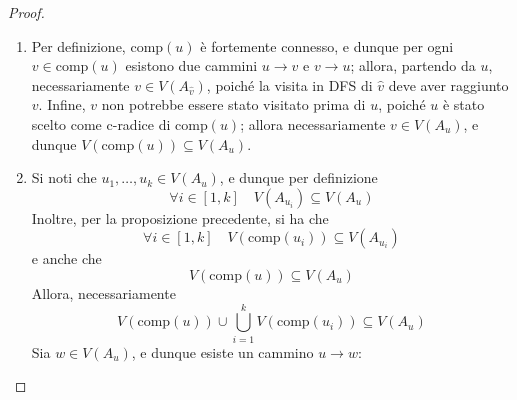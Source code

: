 \documentclass[14pt]{extreport}
\theoremstyle{definition}
\theoremstyle{definition}
\begin{document}
\begin{proof}
    \hspace{0.7cm}
    \begin{enumerate}[\itshape i)]
        \item Per definizione, $\mathrm{comp}(u)$ è fortemente connesso, e dunque per ogni $v \in \mathrm{comp}(u)$ esistono due cammini $u \rightarrow v$ e $v \rightarrow u$; allora, partendo da $u$, necessariamente $v \in V(A_{\hat v})$, poiché la visita in DFS di $\hat v$ deve aver raggiunto $v$. Infine, $v$ non potrebbe essere stato visitato prima di $u$, poiché $u$ è stato scelto come c-radice di $\mathrm{comp}(u)$; allora necessariamente $v \in V(A_u)$, e dunque $V(\mathrm{comp}(u)) \subseteq V(A_u)$.
        \item Si noti che $u_1, \ldots, u_k \in V(A_u)$, e dunque per definizione $$\forall i \in [1, k] \quad V(A_{u_i}) \subseteq V(A_u)$$
            Inoltre, per la proposizione precedente, si ha che $$\forall i \in [1, k] \quad V(\mathrm{comp}(u_i)) \subseteq V(A_{u_i})$$ e anche che $$V(\mathrm{comp}(u)) \subseteq V(A_u)$$
            Allora, necessariamente $$V(\mathrm{comp}(u)) \cup \displaystyle \bigcup_{i = 1}^k {V(\mathrm{comp}(u_i))} \subseteq V(A_u)$$
            Sia $w \in V(A_u)$, e dunque esiste un cammino $u \rightarrow w$:
            

\end{enumerate}
\end{proof}
\end{document}
